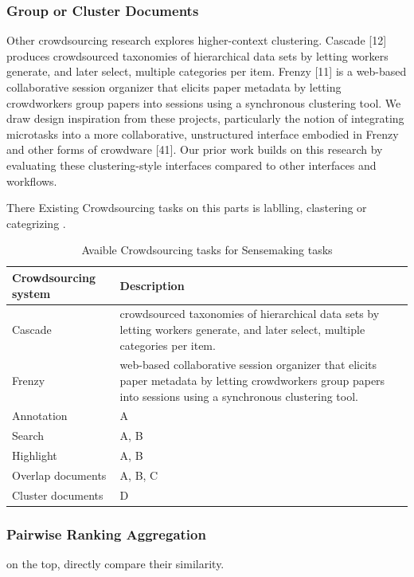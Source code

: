 \documentclass[journal]{vgtc}                %
\begin{document}
\subsubsection{Group or Cluster Documents}

Other crowdsourcing research explores higher-context clustering. Cascade [12] produces crowdsourced taxonomies of hierarchical data sets by letting workers generate, and later select, multiple categories per item. Frenzy [11] is a web-based collaborative session organizer that elicits paper metadata by letting crowdworkers group papers into sessions using a synchronous clustering tool. We draw design inspiration from these projects, particularly the notion of integrating microtasks into a more collaborative, unstructured interface embodied in Frenzy and other forms of crowdware [41]. Our prior work builds on this research by evaluating these clustering-style interfaces compared to other interfaces and workflows.

There
Existing Crowdsourcing tasks on this parts is lablling, clastering or categrizing .


\begin{table}[tb]
  \caption{Avaible Crowdsourcing tasks for Sensemaking tasks}
  \label{tab:tasks}
  \scriptsize%
	\centering%
\begin{tabular}{| m{2cm} | m{6cm} |}
  \hline
   Crowdsourcing system & Description \\
  \hline
  Cascade & crowdsourced taxonomies of hierarchical data sets by letting workers generate, and later select, multiple categories per item. \\
  Frenzy &  web-based collaborative session organizer that elicits paper metadata by letting crowdworkers group papers into sessions using a synchronous clustering tool.\\
  Annotation & A \\
  Search & A, B \\
  Highlight & A, B \\
  Overlap documents & A, B, C\\
  Cluster documents & D \\
  \bottomrule
\end{tabular}
\end{table}




\subsubsection{Pairwise Ranking Aggregation}
on the top, directly compare their similarity.
\end{document}
